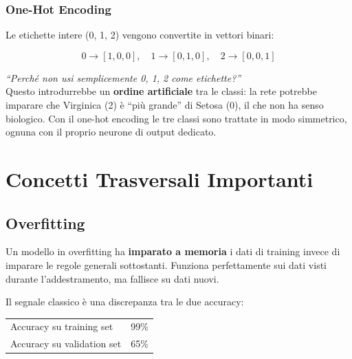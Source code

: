 \documentclass[12pt, a4paper]{article}
\begin{document}
\subsubsection{One-Hot Encoding}

Le etichette intere (0, 1, 2) vengono convertite in vettori binari:

\[
    0 \rightarrow [1,0,0], \quad
    1 \rightarrow [0,1,0], \quad
    2 \rightarrow [0,0,1]
\]

\begin{domanda}
\textit{``Perché non usi semplicemente 0, 1, 2 come etichette?''}\\
Questo introdurrebbe un \textbf{ordine artificiale} tra le classi: la rete
potrebbe imparare che Virginica (2) è ``più grande'' di Setosa (0), il che
non ha senso biologico. Con il one-hot encoding le tre classi sono trattate
in modo simmetrico, ognuna con il proprio neurone di output dedicato.
\end{domanda}

\newpage

\section{Concetti Trasversali Importanti}

\subsection{Overfitting}

Un modello in overfitting ha \textbf{imparato a memoria} i dati di training
invece di imparare le regole generali sottostanti. Funziona perfettamente sui
dati visti durante l'addestramento, ma fallisce su dati nuovi.

\vspace{0.3cm}
\noindent Il segnale classico è una discrepanza tra le due accuracy:
\begin{center}
\begin{tabular}{ll}
    \toprule
    Accuracy su training set  & 99\% \\
    Accuracy su validation set & 65\% \\
    \bottomrule
\end{tabular}
\end{center}
\end{document}
